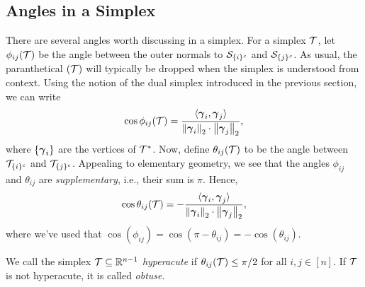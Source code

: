 \subsection{Angles in a Simplex}
\label{sec:background_simplex_angles}
There are several angles worth discussing in a simplex. For a simplex $\mathcal{T}$, let $\phi_{ij}(\mathcal{T})$ be the angle between the outer normals to $\mathcal{S}_{\{i\}^c}$ and $\mathcal{S}_{\{j\}^c}$. As usual, the paranthetical $(\mathcal{T})$ will typically be dropped when the simplex is understood from context. Using the notion of the dual simplex introduced in the previous section, we can write 
 \begin{equation*}
\cos \phi_{ij}(\mathcal{T}) = \frac{\langle \vb*{\gamma}_i,\vb*{\gamma}_j\rangle }{\norm{\vb*{\gamma}_i}_2 \cdot \norm{\vb*{\gamma}_j}_2},
\end{equation*}
where $\{\vb*{\gamma}_i\}$ are the vertices of $\mathcal{T}^*$. 
Now, define $\theta_{ij}(\mathcal{T})$ to be the angle between $\mathcal{T}_{\{i\}^c}$ and $\mathcal{T}_{\{j\}^c}$. Appealing to elementary geometry, we see that the angles $\phi_{ij}$ and $\theta_{ij}$ are \emph{supplementary}, i.e., their sum is $\pi$. Hence, 
\begin{equation}
\label{eq:cos_theta_ij}
\cos \theta_{ij}(\mathcal{T}) = - \frac{\langle \vb*{\gamma}_i,\vb*{\gamma}_j\rangle }{\norm{\vb*{\gamma}_i}_2 \cdot \norm{\vb*{\gamma}_j}_2},
\end{equation}
where we've used that $\cos(\phi_{ij}) = \cos(\pi - \theta_{ij}) = -\cos(\theta_{ij})$. 

\begin{definition}
	\label{def:hyperacute}
	We call the simplex $\mathcal{T}\subseteq \mathbb{R}^{n-1}$ \emph{hyperacute} if $\theta_{ij}(\mathcal{T})\leq \pi/2$ for all $i,j\in[n]$. If $\mathcal{T}$ is not hyperacute, it is called \emph{obtuse}. 
\end{definition}


